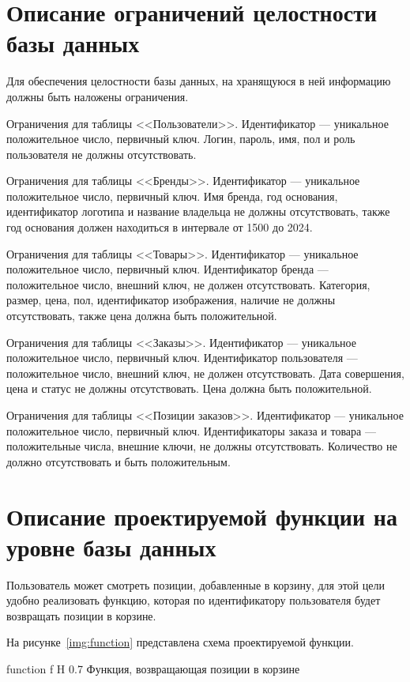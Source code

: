 \documentclass{bmstu}
\begin{document}
\section{Описание ограничений целостности базы данных}

Для обеспечения целостности базы данных, на хранящуюся в ней информацию должны быть наложены ограничения.

Ограничения для таблицы <<Пользователи>>. 
Идентификатор --- уникальное положительное число, первичный ключ. 
Логин, пароль, имя, пол и роль пользователя не должны отсутствовать.

Ограничения для таблицы <<Бренды>>. 
Идентификатор --- уникальное положительное число, первичный ключ. 
Имя бренда, год основания, идентификатор логотипа и название владельца не должны отсутствовать, также год основания должен находиться в интервале от 1500 до 2024.

Ограничения для таблицы <<Товары>>. 
Идентификатор --- уникальное положительное число, первичный ключ. 
Идентификатор бренда --- положительное число, внешний ключ, не должен отсутствовать. 
Категория, размер, цена, пол, идентификатор изображения, наличие не должны отсутствовать, также цена должна быть положительной.

Ограничения для таблицы <<Заказы>>. 
Идентификатор --- уникальное положительное число, первичный ключ. 
Идентификатор пользователя --- положительное число, внешний ключ, не должен отсутствовать. 
Дата совершения, цена и статус не должны отсутствовать. Цена должна быть положительной.

Ограничения для таблицы <<Позиции заказов>>. 
Идентификатор --- уникальное положительное число, первичный ключ. 
Идентификаторы заказа и товара --- положительные числа, внешние ключи, не должны отсутствовать. 
Количество не должно отсутствовать и быть положительным.

\section{Описание проектируемой функции на уровне базы данных}

Пользователь может смотреть позиции, добавленные в корзину, для этой цели удобно реализовать функцию, которая по идентификатору пользователя будет возвращать позиции в корзине.

На рисунке~\ref{img:function} представлена схема проектируемой функции.

    {function}
    {f}
    {H}
    {0.7\textwidth}
    {Функция, возвращающая позиции в корзине}
\end{document}
